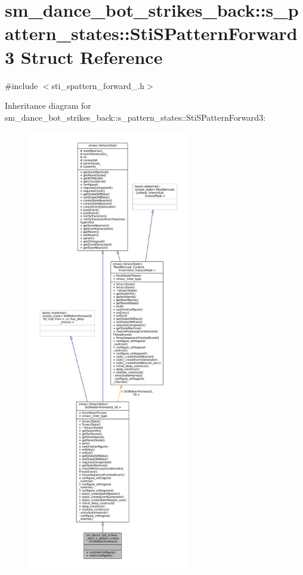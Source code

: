 \hypertarget{structsm__dance__bot__strikes__back_1_1s__pattern__states_1_1StiSPatternForward3}{}\section{sm\+\_\+dance\+\_\+bot\+\_\+strikes\+\_\+back\+:\+:s\+\_\+pattern\+\_\+states\+:\+:Sti\+S\+Pattern\+Forward3 Struct Reference}
\label{structsm__dance__bot__strikes__back_1_1s__pattern__states_1_1StiSPatternForward3}


{\ttfamily \#include $<$sti\+\_\+spattern\+\_\+forward\+\_.\+h$>$}



Inheritance diagram for sm\+\_\+dance\+\_\+bot\+\_\+strikes\+\_\+back\+:\+:s\+\_\+pattern\+\_\+states\+:\+:Sti\+S\+Pattern\+Forward3\+:
\nopagebreak
\begin{figure}[H]
\begin{center}
\leavevmode
\includegraphics[height=550pt]{structsm__dance__bot__strikes__back_1_1s__pattern__states_1_1StiSPatternForward3__inherit__graph}
\end{center}
\end{figure}


